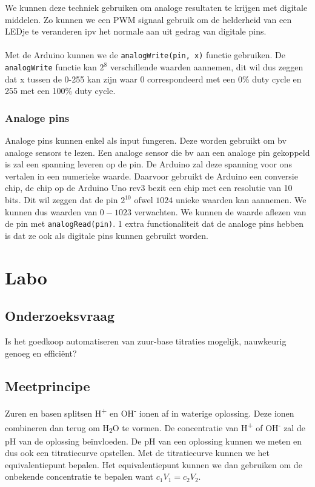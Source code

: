 \documentclass[10pt,twoside]{report}
\newcommand{\code}[1]{{\texttt{#1}}}
\begin{document}
We kunnen deze techniek gebruiken om analoge resultaten te krijgen met digitale middelen. Zo kunnen we een PWM signaal gebruik om de helderheid van een LEDje te veranderen ipv het normale aan uit gedrag van digitale pins.\\\\
Met de Arduino kunnen we de \code{analogWrite(pin, x)} functie gebruiken. De \code{analogWrite} functie kan $2^8$ verschillende waarden aannemen, dit wil dus zeggen dat x tussen de 0-255 kan zijn waar 0 correspondeerd met een 0\% duty cycle en 255 met een 100\% duty cycle.

\subsection{Analoge pins}
Analoge pins kunnen enkel als input fungeren. Deze worden gebruikt om bv analoge sensors te lezen. Een analoge sensor die bv aan een analoge pin gekoppeld is zal een spanning leveren op de pin. De Arduino zal deze spanning voor ons vertalen in een numerieke waarde. Daarvoor gebruikt de Arduino een conversie chip, de chip op de Arduino Uno rev3 bezit een chip met een resolutie van 10 bits. Dit wil zeggen dat de pin $2^{10}$ ofwel $1024$ unieke waarden kan aannemen. We kunnen dus waarden van $0-1023$ verwachten. We kunnen de waarde aflezen van de pin met \code{analogRead(pin)}. 1 extra functionaliteit dat de analoge pins hebben is dat ze ook als digitale pins kunnen gebruikt worden.

\chapter{Labo}
\section{Onderzoeksvraag}
Is het goedkoop automatiseren van zuur-base titraties mogelijk, nauwkeurig genoeg en efficiënt?

\section{Meetprincipe}
Zuren en basen splitsen H\textsuperscript{+} en OH\textsuperscript{-} ionen af in waterige oplossing. Deze ionen combineren dan terug om H\textsubscript{2}O te vormen. De concentratie van H\textsuperscript{+} of OH\textsuperscript{-} zal de pH van de oplossing beïnvloeden. De pH van een oplossing kunnen we meten en dus ook een titratiecurve opstellen. Met de titratiecurve kunnen we het equivalentiepunt bepalen. Het equivalentiepunt kunnen we dan gebruiken om de onbekende concentratie te bepalen want $c_1V_1 = c_2V_2$.
\end{document}

